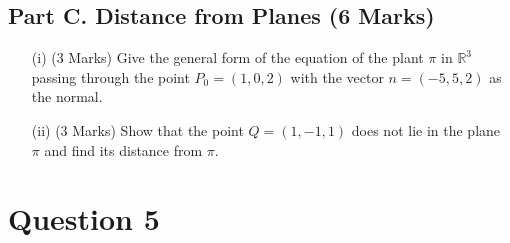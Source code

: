 \documentclass[a4paper,12pt]{article}
\begin{document}
	


\subsection*{Part C. Distance from Planes (6 Marks)}	

\begin{itemize}
	\item[(i)] (3 Marks) Give the general form of the equation of the plant $\pi$ in $\mathbb{R}^3$ passing through the point $P_0 =(1,0,2)$ with the vector $n=(-5,5,2)$ as the normal.
	
	
	\item[(ii)] (3 Marks) Show that the point $Q=(1,-1,1)$ does not lie in the plane $\pi$ and find its distance from $\pi$.
\end{itemize}

%	
\section*{Question 5}
\end{document}

